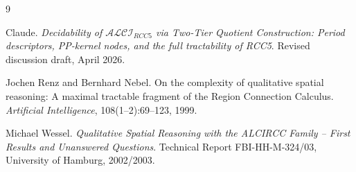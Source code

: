 \documentclass[11pt]{article}
\begin{document}
\begin{thebibliography}{9}

Claude.
\newblock \emph{Decidability of $\mathcal{ALCI}_{RCC5}$ via Two-Tier Quotient Construction: Period descriptors, PP-kernel nodes, and the full tractability of RCC5}.
\newblock Revised discussion draft, April 2026.

Jochen Renz and Bernhard Nebel.
\newblock On the complexity of qualitative spatial reasoning: A maximal tractable fragment of the Region Connection Calculus.
\newblock \emph{Artificial Intelligence}, 108(1--2):69--123, 1999.

Michael Wessel.
\newblock \emph{Qualitative Spatial Reasoning with the ALCIRCC Family -- First Results and Unanswered Questions}.
\newblock Technical Report FBI-HH-M-324/03, University of Hamburg, 2002/2003.

\end{thebibliography}
\end{document}
